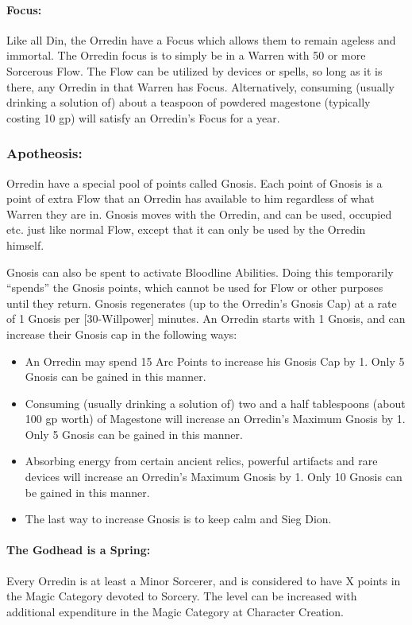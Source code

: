 \documentclass[oneside,11pt,english]{book}
\begin{document}
\paragraph{Focus:} Like all Din, the Orredin have a Focus which allows them to remain ageless and immortal. The 
Orredin focus is to simply be in a Warren with 50 or more Sorcerous Flow. The Flow can be utilized by 
devices or spells, so long as it is there, any Orredin in that Warren has Focus. Alternatively, consuming 
(usually drinking a solution of) about a teaspoon of powdered magestone (typically costing 10 gp) will 
satisfy an Orredin's Focus for a year. 
\subsubsection{Apotheosis:} Orredin have a special pool of points called Gnosis. Each point of Gnosis is a point of extra 
Flow that an Orredin has available to him regardless of what Warren they are in. Gnosis moves with the 
Orredin, and can be used, occupied etc. just like normal Flow, except that it can only be used by the 
Orredin himself.

Gnosis can also be spent to activate Bloodline Abilities. Doing this temporarily “spends” the Gnosis 
points, which cannot be used for Flow or other purposes until they return. Gnosis regenerates (up to the 
Orredin’s Gnosis Cap) at a rate of 1 Gnosis per [30-Willpower] minutes. 
An Orredin starts with 1 Gnosis, and can increase their Gnosis cap in the following ways:
\begin{itemize}
	\item An Orredin may spend 15 Arc Points to increase his Gnosis Cap by 1. Only 5 Gnosis can be gained in this manner. 
	\item Consuming (usually drinking a solution of) two and a half tablespoons (about 100 gp worth) of Magestone will increase an Orredin's Maximum Gnosis by 1. Only 5 Gnosis can be gained in this manner.
	\item Absorbing energy from certain ancient relics, powerful artifacts and rare devices will increase an Orredin's Maximum Gnosis by 1. Only 10 Gnosis can be gained in this manner. 
	\item The last way to increase Gnosis is to keep calm and Sieg Dion.
\end{itemize}
\paragraph{The Godhead is a Spring:} Every Orredin is at least a Minor Sorcerer, and is considered to have X points in the Magic Category devoted to Sorcery. The level can be increased with additional expenditure in the Magic Category at Character Creation. 
\end{document}
